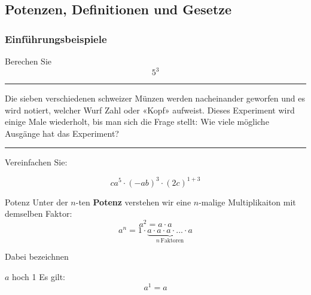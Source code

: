 \newcommand{\aaaa}{a\cdot a \cdot a \cdot{} ... \cdot a}
\newcommand{\bbbb}{b\cdot b \cdot b \cdot{} ... \cdot b}

\newpage
\subsection{Potenzen, Definitionen und Gesetze}

\subsubsection{Einführungsbeispiele}

Berechen Sie
$$5^3$$


\hrule

Die sieben verschiedenen schweizer Münzen werden nacheinander geworfen
und es wird notiert, welcher Wurf Zahl oder «Kopf» aufweist. Dieses
Experiment wird einige Male wiederholt, bis man sich die Frage stellt:
Wie viele mögliche Ausgänge hat das Experiment?


\hrule

Vereinfachen Sie:

$$ca^5\cdot(-ab)^3\cdot{}(2c)^{1+3}$$





\begin{definition}{Potenz}{}
Unter der $n$-ten \textbf{Potenz} verstehen wir eine $n$-malige Multiplikaiton mit demselben Faktor:
$$a^2 = a\cdot a$$
$$a^n = 1\cdot{} \underbrace{\aaaa}_{n\, \text{Faktoren}}$$
\end{definition}
Dabei bezeichnen


\begin{gesetz}{$a$ hoch 1}{}
  Es gilt:
  $$a^1 = a$$
\end{gesetz}



